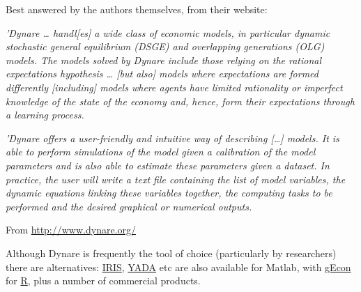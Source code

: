 \documentclass[
  letterpaper,
]{book}
\begin{document}
\begin{tcolorbox}[enhanced jigsaw, breakable, left=2mm, arc=.35mm, toptitle=1mm, colbacktitle=quarto-callout-note-color!10!white, opacityback=0, bottomrule=.15mm, leftrule=.75mm, opacitybacktitle=0.6, title=\textcolor{quarto-callout-note-color}{\faInfo}\hspace{0.5em}{What is Dynare?}, colframe=quarto-callout-note-color-frame, coltitle=black, titlerule=0mm, toprule=.15mm, bottomtitle=1mm, rightrule=.15mm, colback=white]

Best answered by the authors themselves, from their website:

\emph{'Dynare \ldots{} handl{[}es{]} a wide class of economic models, in
particular dynamic stochastic general equilibrium (DSGE) and overlapping
generations (OLG) models. The models solved by Dynare include those
relying on the rational expectations hypothesis \ldots{} {[}but also{]}
models where expectations are formed differently {[}including{]} models
where agents have limited rationality or imperfect knowledge of the
state of the economy and, hence, form their expectations through a
learning process.}

\emph{'Dynare offers a user-friendly and intuitive way of describing
{[}\ldots{]} models. It is able to perform simulations of the model
given a calibration of the model parameters and is also able to estimate
these parameters given a dataset. In practice, the user will write a
text file containing the list of model variables, the dynamic equations
linking these variables together, the computing tasks to be performed
and the desired graphical or numerical outputs.}

From \url{http://www.dynare.org/}

\end{tcolorbox}

Although Dynare is frequently the tool of choice (particularly by
researchers) there are alternatives:
\href{https://iris.igpmn.org/}{IRIS},
\href{http://www.texlips.net/yada/}{YADA} etc are also available for
Matlab, with \href{https://gecon.r-forge.r-project.org/}{gEcon} for
\href{https://cran.r-project.org/}{R}, plus a number of commercial
products.
\end{document}
